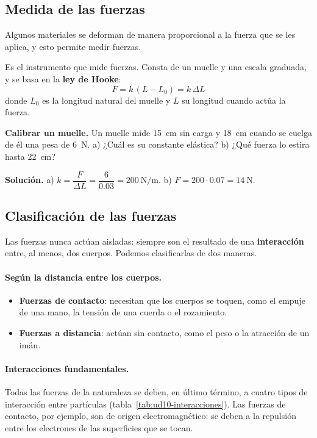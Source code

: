 \subsection{Medida de las fuerzas}

Algunos materiales se deforman de manera proporcional a la fuerza que se les aplica, y esto permite medir fuerzas.

\begin{definition}[Dinamómetro]
    Es el instrumento que mide fuerzas. Consta de un muelle y una escala graduada, y se basa en la \textbf{ley de Hooke}:
    \[ F = k\,(L - L_0) = k\,\Delta L \]
    donde \(L_0\) es la longitud natural del muelle y \(L\) su longitud cuando actúa la fuerza.
\end{definition}

\begin{example}
    \textbf{Calibrar un muelle.} Un muelle mide \qty{15}{\cm} sin carga y \qty{18}{\cm} cuando se cuelga de él una pesa de
    \qty{6}{\newton}. a) ¿Cuál es su constante elástica? b) ¿Qué fuerza lo estira hasta \qty{22}{\cm}?

    \textbf{Solución.} a) \(k = \dfrac{F}{\Delta L} = \dfrac{6}{\num{0.03}} = \qty{200}{\newton\per\m}\).
    b) \(F = 200 \cdot \num{0.07} = \qty{14}{\newton}\).
\end{example}

\subsection{Clasificación de las fuerzas}

Las fuerzas nunca actúan aisladas: siempre son el resultado de una \textbf{interacción} entre, al menos, dos cuerpos. Podemos
clasificarlas de dos maneras.

\paragraph{Según la distancia entre los cuerpos.}
\begin{itemize}
    \item \textbf{Fuerzas de contacto}: necesitan que los cuerpos se toquen, como el empuje de una mano, la tensión de una cuerda o el
    rozamiento.
    \item \textbf{Fuerzas a distancia}: actúan sin contacto, como el peso o la atracción de un imán.
\end{itemize}

\paragraph{Interacciones fundamentales.} Todas las fuerzas de la naturaleza se deben, en último término, a cuatro tipos de
interacción entre partículas (tabla~\ref{tab:ud10-interacciones}). Las fuerzas de contacto, por ejemplo, son de origen
electromagnético: se deben a la repulsión entre los electrones de las superficies que se tocan.

